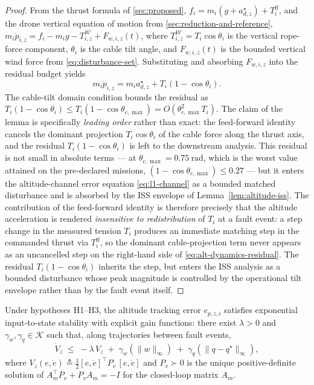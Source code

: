 \begin{proof}
From the thrust formula of \cref{sec:proposed}, $f_i = m_i(g + a_{d,z}^\star) + T_i^{\mathrm{ff}}$, and the drone vertical equation of motion from \cref{sec:reduction-and-reference}, $m_i \ddot{p}_{i,z} = f_i - m_i g - T_{i,z}^{\mathcal{W}} + F_{w,i,z}(t)$, where $T_{i,z}^{\mathcal{W}} = T_i \cos\theta_i$ is the vertical rope-force component, $\theta_i$ is the cable tilt angle, and $F_{w,i,z}(t)$ is the bounded vertical wind force from \eqref{eq:disturbance-set}. Substituting and absorbing $F_{w,i,z}$ into the residual budget yields
\begin{equation}
  m_i \ddot{p}_{i,z}
    = m_i a_{d,z}^\star + T_i(1 - \cos\theta_i).
  \label{eq:alt-dynamics-residual}
\end{equation}
The cable-tilt domain condition bounds the residual as $T_i(1 - \cos\theta_i) \le T_i(1 - \cos\theta_{c,\max}) = O(\theta_{c,\max}^2 T_i)$. The claim of the lemma is specifically \emph{leading order} rather than exact: the feed-forward identity cancels the dominant projection $T_i \cos\theta_i$ of the cable force along the thrust axis, and the residual $T_i(1 - \cos\theta_i)$ is left to the downstream analysis. This residual is not small in absolute terms --- at $\theta_{c,\max} = \SI{0.75}{\radian}$, which is the worst value attained on the pre-declared missions, $(1 - \cos\theta_{c,\max}) \le 0.27$ --- but it enters the altitude-channel error equation \eqref{eq:l1-channel} as a bounded matched disturbance and is absorbed by the ISS envelope of Lemma~\ref{lem:altitude-iss}. The contribution of the feed-forward identity is therefore precisely that the altitude acceleration is rendered \emph{insensitive to redistribution} of $T_i$ at a fault event: a step change in the measured tension $T_i$ produces an immediate matching step in the commanded thrust via $T_i^{\mathrm{ff}}$, so the dominant cable-projection term never appears as an uncancelled step on the right-hand side of \eqref{eq:alt-dynamics-residual}. The residual $T_i(1 - \cos\theta_i)$ inherits the step, but enters the ISS analysis as a bounded disturbance whose peak magnitude is controlled by the operational tilt envelope rather than by the fault event itself.
\end{proof}

\begin{lemma}
\label{lem:altitude-iss}
Under hypotheses H1--H3, the altitude tracking error $e_{p,z,i}$ satisfies exponential input-to-state stability with explicit gain functions: there exist $\lambda > 0$ and $\gamma_w, \gamma_q \in \mathcal{K}$ such that, along trajectories between fault events,
\begin{equation}
  \dot V_z \;\le\; -\lambda\,V_z
    \;+\; \gamma_w(\|w\|_\infty)
    \;+\; \gamma_q(\|q - q^\star\|_\infty),
  \label{eq:lyapunov-decay-alt}
\end{equation}
where $V_z(e,\dot e) \triangleq \tfrac{1}{2}[e,\dot e]^\top P_v\,[e,\dot e]$ and $P_v \succ 0$ is the unique positive-definite solution of $A_m^\top P_v + P_v A_m = -I$ for the closed-loop matrix $A_m$.
\end{lemma}

